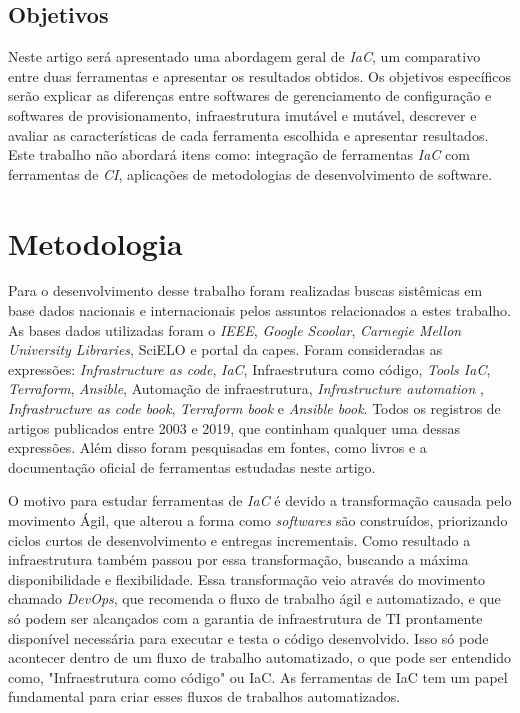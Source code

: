 \subsection{Objetivos}

Neste artigo será apresentado uma abordagem geral de \textit{IaC}, um comparativo entre duas ferramentas e apresentar os resultados obtidos. Os objetivos específicos serão explicar as diferenças entre softwares de gerenciamento de configuração e softwares de provisionamento, infraestrutura imutável e mutável, descrever e avaliar as características de cada ferramenta escolhida
e apresentar resultados. Este trabalho não abordará itens como: integração de ferramentas \textit{IaC}
com ferramentas de \textit{CI}, aplicações de metodologias de desenvolvimento de software.

\section{\esp Metodologia}

Para o desenvolvimento desse trabalho foram realizadas buscas sistêmicas em base dados nacionais e internacionais pelos assuntos relacionados a estes trabalho. As bases dados utilizadas foram o \textit{IEEE}, \textit{Google Scoolar}, \textit{Carnegie Mellon University Libraries}, SciELO e portal da capes. Foram consideradas as expressões:  \textit{Infrastructure as code}, \textit{IaC}, Infraestrutura como código, \textit{Tools IaC}, \textit{Terraform}, \textit{Ansible}, Automação de infraestrutura, \textit{Infrastructure automation} , \textit{Infrastructure as code book}, \textit{Terraform book} e \textit{Ansible book}. Todos os registros de artigos publicados entre 2003 e 2019, que continham qualquer uma dessas expressões. Além disso foram pesquisadas em fontes, como livros e a documentação oficial de ferramentas estudadas neste artigo.

O motivo para estudar ferramentas de \textit{IaC} é devido a transformação causada pelo movimento Ágil, que alterou a forma como \textit{softwares} são construídos, priorizando ciclos curtos de desenvolvimento e entregas incrementais. Como resultado a infraestrutura também passou por essa transformação, buscando a máxima disponibilidade e flexibilidade. Essa transformação veio através do movimento chamado \textit{DevOps}, que recomenda o fluxo de trabalho ágil e automatizado, e que só podem ser alcançados com a garantia de infraestrutura de TI prontamente disponível necessária para executar e testa o código desenvolvido. Isso só pode acontecer dentro de um fluxo de trabalho automatizado, o que pode ser entendido como, "Infraestrutura como código" ou IaC. As ferramentas de IaC tem um papel fundamental para criar esses fluxos de trabalhos automatizados.

